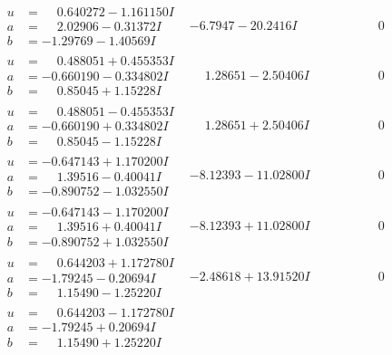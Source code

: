 \documentclass[1p]{elsarticle_modified}
\theoremstyle{definition}
\begin{document}
$$\begin{array}{c|c|c}
\begin{aligned}
u &= \phantom{-}0.640272 - 1.161150 I \\
a &= \phantom{-}2.02906 - 0.31372 I \\
b &= -1.29769 - 1.40569 I\end{aligned}
 & -6.7947 - 20.2416 I & \phantom{-0.000000 } 0 \\ \hline\begin{aligned}
u &= \phantom{-}0.488051 + 0.455353 I \\
a &= -0.660190 - 0.334802 I \\
b &= \phantom{-}0.85045 + 1.15228 I\end{aligned}
 & \phantom{-}1.28651 - 2.50406 I & \phantom{-0.000000 } 0 \\ \hline\begin{aligned}
u &= \phantom{-}0.488051 - 0.455353 I \\
a &= -0.660190 + 0.334802 I \\
b &= \phantom{-}0.85045 - 1.15228 I\end{aligned}
 & \phantom{-}1.28651 + 2.50406 I & \phantom{-0.000000 } 0 \\ \hline\begin{aligned}
u &= -0.647143 + 1.170200 I \\
a &= \phantom{-}1.39516 - 0.40041 I \\
b &= -0.890752 - 1.032550 I\end{aligned}
 & -8.12393 - 11.02800 I & \phantom{-0.000000 } 0 \\ \hline\begin{aligned}
u &= -0.647143 - 1.170200 I \\
a &= \phantom{-}1.39516 + 0.40041 I \\
b &= -0.890752 + 1.032550 I\end{aligned}
 & -8.12393 + 11.02800 I & \phantom{-0.000000 } 0 \\ \hline\begin{aligned}
u &= \phantom{-}0.644203 + 1.172780 I \\
a &= -1.79245 - 0.20694 I \\
b &= \phantom{-}1.15490 - 1.25220 I\end{aligned}
 & -2.48618 + 13.91520 I & \phantom{-0.000000 } 0 \\ \hline\begin{aligned}
u &= \phantom{-}0.644203 - 1.172780 I \\
a &= -1.79245 + 0.20694 I \\
b &= \phantom{-}1.15490 + 1.25220 I\end{aligned}

\end{array}$$
\end{document}
